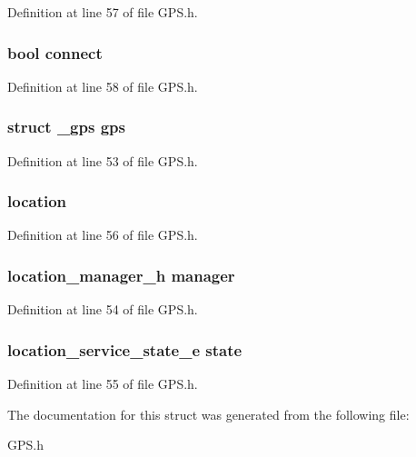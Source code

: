 Definition at line 57 of file G\-P\-S.\-h.

\hypertarget{structGPSExtends_af4e68d5926444b7651a9095ee0b26e48}{
\subsubsection[{connect}]{\setlength{\rightskip}{0pt plus 5cm}bool connect}}\label{structGPSExtends_af4e68d5926444b7651a9095ee0b26e48}


Definition at line 58 of file G\-P\-S.\-h.

\hypertarget{structGPSExtends_ab3ecc8b2ec37f482acf1ac0c1a3d5e4e}{
\subsubsection[{gps}]{\setlength{\rightskip}{0pt plus 5cm}struct {\bf \-\_\-gps} gps}}\label{structGPSExtends_ab3ecc8b2ec37f482acf1ac0c1a3d5e4e}


Definition at line 53 of file G\-P\-S.\-h.

\hypertarget{structGPSExtends_a260defa82d536dcea2aa22452b862110}{
\subsubsection[{location}]{ location}}\label{structGPSExtends_a260defa82d536dcea2aa22452b862110}


Definition at line 56 of file G\-P\-S.\-h.

\hypertarget{structGPSExtends_a3454051e15c896bc1d5271d43c810958}{
\subsubsection[{manager}]{\setlength{\rightskip}{0pt plus 5cm}location\-\_\-manager\-\_\-h manager}}\label{structGPSExtends_a3454051e15c896bc1d5271d43c810958}


Definition at line 54 of file G\-P\-S.\-h.

\hypertarget{structGPSExtends_ad003a392ffec4bbd3a2839bb4e042e56}{
\subsubsection[{state}]{\setlength{\rightskip}{0pt plus 5cm}location\-\_\-service\-\_\-state\-\_\-e state}}\label{structGPSExtends_ad003a392ffec4bbd3a2839bb4e042e56}


Definition at line 55 of file G\-P\-S.\-h.



The documentation for this struct was generated from the following file\-:\begin{DoxyCompactItemize}
\item 
G\-P\-S.\-h\end{DoxyCompactItemize}
